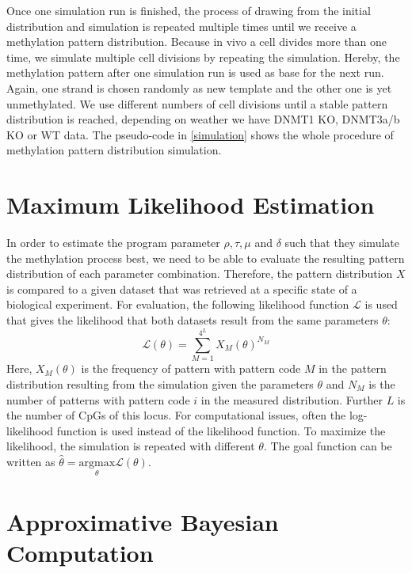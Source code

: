 Once one simulation run is finished, the process of drawing from the initial distribution and simulation is repeated multiple times until we receive a methylation pattern distribution.\newline
Because in vivo a cell divides more than one time, we simulate multiple cell divisions by repeating the simulation. Hereby, the methylation pattern after one simulation run is used as base for the next run. Again, one strand is chosen randomly as new template and the other one is yet unmethylated. We use different numbers of cell divisions until a stable pattern distribution is reached, depending on weather we have DNMT1 \acf{KO}, DNMT3a/b \ac{KO} or \acf{WT} data. The pseudo-code in \ref{simulation} shows the whole procedure of methylation pattern distribution simulation.

\section{Maximum Likelihood Estimation}
\label{MLE}
In order to estimate the program parameter $\rho, \tau, \mu$ and $\delta$ such that they simulate the methylation process best, we need to be able to evaluate the resulting pattern distribution of each parameter combination. Therefore, the pattern distribution $X$ is compared to a given dataset that was retrieved at a specific state of a biological experiment. For evaluation, the following likelihood function $\mathcal{L}$ is used that gives the likelihood that both datasets result from the same parameters $\theta$:
\[\mathcal{L}(\theta) = \sum_{M=1}^{4^L}{X_M(\theta)^{N_M}}\]
Here, $X_M(\theta)$ is the frequency of pattern with pattern code $M$ in the pattern distribution resulting from the simulation given the parameters $\theta$ and $N_M$ is the number of patterns with pattern code $i$ in the measured distribution. Further $L$ is the number of \acp{CpG} of this locus. For computational issues, often the log-likelihood function is used instead of the likelihood function. To maximize the likelihood, the simulation is repeated with different $\theta$. The goal function can be written as\newline
$\hat{\theta} = \underset{\theta}{\mathrm{argmax}} \mathcal{L}(\theta)$.

\section{Approximative Bayesian Computation}
\label{ABC}
